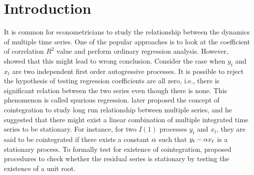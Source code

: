 \chapter{Introduction}
\ifpdf
    \graphicspath{{Introduction/IntroductionFigs/PNG/}{Introduction/IntroductionFigs/PDF/}{Introduction/IntroductionFigs/}}
\else
    \graphicspath{{Introduction/IntroductionFigs/EPS/}{Introduction/IntroductionFigs/}}
\fi

It is common for econometricians to study the relationship between the dynamics of multiple time series. One of the popular approaches is to look at the coefficient of correlation $R^2$ value and perform ordinary regression analysis. However, \cite{grangernewbold1974} showed that this might lead to wrong conclusion. Consider the case when $y_t$ and $x_t$ are two independent first order autogressive processes. It is possible to reject the hypothesis of testing regression coefficients are all zero, i.e., there is significant relation between the two series even though there is none. This phenomenon is called spurious regression. \cite{granger1986} later proposed the concept of cointegration to study long run relationship between multiple series, and he suggested that there might exist a linear combination of multiple integrated time series to be stationary. For instance, for two $I(1)$ processes $y_t$ and $x_t$, they are said to be cointegrated if there exists a constant $\alpha$ such that $y_t - \alpha x_t$ is a stationary process. To formally test for existence of cointegration, \cite{englegranger1987} proposed procedures to check whether the residual series is stationary by testing the existence of a unit root.

